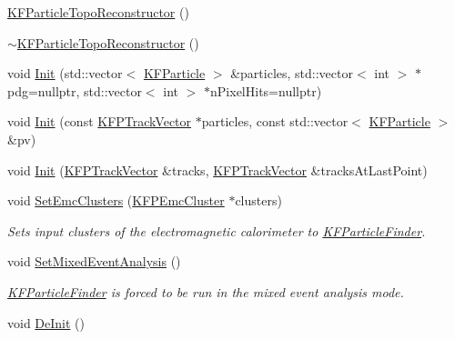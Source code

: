 \begin{DoxyCompactItemize}
\item 
\hyperlink{classKFParticleTopoReconstructor_a24e402c39551910122f724f02cce51b1}{K\+F\+Particle\+Topo\+Reconstructor} ()
\item 
\hyperlink{classKFParticleTopoReconstructor_a2f973f554cc76d4d0ab53f21bfc8bd02}{$\sim$\+K\+F\+Particle\+Topo\+Reconstructor} ()
\item 
void \hyperlink{classKFParticleTopoReconstructor_abc388e4cf29cea13f63745a82a875dfc}{Init} (std\+::vector$<$ \hyperlink{classKFParticle}{K\+F\+Particle} $>$ \&particles, std\+::vector$<$ int $>$ $\ast$pdg=nullptr, std\+::vector$<$ int $>$ $\ast$n\+Pixel\+Hits=nullptr)
\item 
void \hyperlink{classKFParticleTopoReconstructor_ac9ee99b3d846234ef05b11d018e88af4}{Init} (const \hyperlink{classKFPTrackVector}{K\+F\+P\+Track\+Vector} $\ast$particles, const std\+::vector$<$ \hyperlink{classKFParticle}{K\+F\+Particle} $>$ \&pv)
\item 
void \hyperlink{classKFParticleTopoReconstructor_a927089e1d033d468ed0c2136ca417881}{Init} (\hyperlink{classKFPTrackVector}{K\+F\+P\+Track\+Vector} \&tracks, \hyperlink{classKFPTrackVector}{K\+F\+P\+Track\+Vector} \&tracks\+At\+Last\+Point)
\item 
void \hyperlink{classKFParticleTopoReconstructor_a762e1fb5280b43ea11f904a05af54a8b}{Set\+Emc\+Clusters} (\hyperlink{classKFPEmcCluster}{K\+F\+P\+Emc\+Cluster} $\ast$clusters)\hypertarget{classKFParticleTopoReconstructor_a762e1fb5280b43ea11f904a05af54a8b}{}\label{classKFParticleTopoReconstructor_a762e1fb5280b43ea11f904a05af54a8b}

\begin{DoxyCompactList}\small\item\em Sets input clusters of the electromagnetic calorimeter to \hyperlink{classKFParticleFinder}{K\+F\+Particle\+Finder}. \end{DoxyCompactList}\item 
void \hyperlink{classKFParticleTopoReconstructor_acff10c868bedc823cf84c28ad1264910}{Set\+Mixed\+Event\+Analysis} ()\hypertarget{classKFParticleTopoReconstructor_acff10c868bedc823cf84c28ad1264910}{}\label{classKFParticleTopoReconstructor_acff10c868bedc823cf84c28ad1264910}

\begin{DoxyCompactList}\small\item\em \hyperlink{classKFParticleFinder}{K\+F\+Particle\+Finder} is forced to be run in the mixed event analysis mode. \end{DoxyCompactList}\item 
void \hyperlink{classKFParticleTopoReconstructor_a91e48b54c89a67bf20127b1c1c067554}{De\+Init} ()\hypertarget{classKFParticleTopoReconstructor_a91e48b54c89a67bf20127b1c1c067554}{}\label{classKFParticleTopoReconstructor_a91e48b54c89a67bf20127b1c1c067554}


\end{DoxyCompactItemize}
